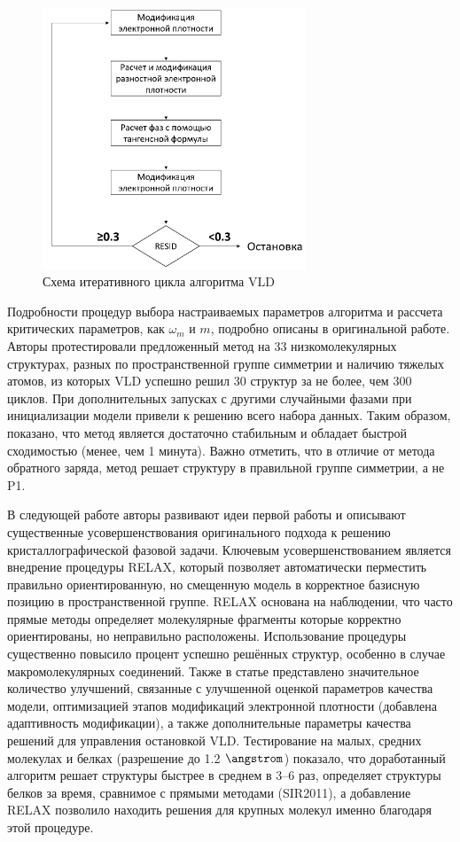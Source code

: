 \begin{figure}[H]
	\centering
	\includegraphics[width=0.7\textwidth]{figures/vld.png}\hfill
	\caption{Схема итеративного цикла алгоритма VLD}
	\label{vld}
\end{figure}

Подробности процедур выбора настраиваемых параметров алгоритма и рассчета критических параметров, как $\omega_m$ и $m$, подробно описаны в оригинальной работе. Авторы протестировали предложенный метод на 33 низкомолекулярных структурах, разных по пространственной группе симметрии и наличию тяжелых атомов, из которых VLD успешно решил 30 структур за не более, чем 300 циклов. При дополнительных запусках с другими случайными фазами при инициализации модели привели к решению всего набора данных. Таким образом, показано, что метод является достаточно стабильным и обладает быстрой сходимостью (менее, чем 1 минута). Важно отметить, что в отличие от метода обратного заряда, метод решает структуру в правильной группе симметрии, а не P1.

В следующей работе \cite{burla_advances_2011} авторы развивают идеи первой работы и описывают существенные усовершенствования оригинального подхода к решению кристаллографической фазовой задачи. Ключевым усовершенствованием является внедрение процедуры RELAX, который позволяет автоматически перместить правильно ориентированную, но смещенную модель в корректное базисную позицию в пространственной группе. RELAX основана на наблюдении, что часто прямые методы определяет молекулярные фрагменты которые корректно ориентированы, но неправильно расположены. Использование процедуры существенно повысило процент успешно решённых структур, особенно в случае макромолекулярных соединений. Также в статье представлено значительное количество улучшений, связанные с улучшенной оценкой параметров качества модели, оптимизацией этапов модификаций электронной плотности (добавлена адаптивность модификации), а также дополнительные параметры качества решений для управления остановкой VLD. Тестирование на малых, средних молекулах и белках (разрешение до 1.2 $\angstrom$) показало, что доработанный алгоритм решает структуры быстрее в среднем в 3--6 раз, определяет структуры белков за время, сравнимое с прямыми методами (SIR2011), а добавление RELAX позволило находить решения для крупных молекул именно благодаря этой процедуре.


